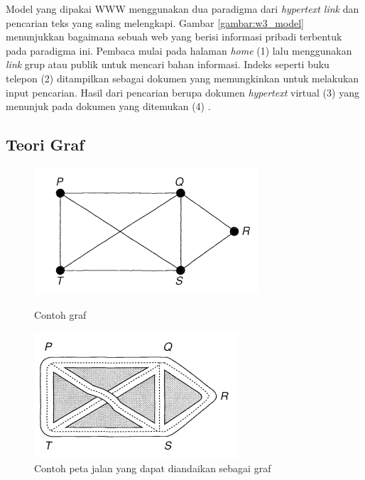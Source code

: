\documentclass[
	a4paper, %
	12pt, %
	unnumberedsections, %
	twoside, %
]{LTJournalArticle}
\begin{document}
Model yang dipakai WWW menggunakan dua paradigma dari \textit{hypertext link} dan pencarian teks yang saling melengkapi. Gambar \ref{gambar:w3_model} menunjukkan bagaimana sebuah web yang berisi informasi pribadi terbentuk pada paradigma ini. Pembaca mulai pada halaman \textit{home} (1) lalu menggunakan \textit{link} grup atau publik untuk mencari bahan informasi. Indeks seperti buku telepon (2) ditampilkan sebagai dokumen yang memungkinkan untuk melakukan input pencarian. Hasil dari pencarian berupa dokumen \textit{hypertext} virtual (3) yang menunjuk pada dokumen yang ditemukan (4) \citep{bernersLee1992}.

\subsection{Teori Graf}

\begin{figure}[!htb]
\begin{minipage}{0.48\linewidth}
	\centering
	\includegraphics[width=.7\linewidth]{gambar/graph_example}
	\caption{Contoh graf \citep{wilson1996}}
	\label{gambar:graph_example}
\end{minipage}\hfill
\begin{minipage}{0.48\linewidth}
	\centering
	\includegraphics[width=.7\linewidth]{gambar/graph_example_2}
	\caption{Contoh peta jalan yang dapat diandaikan sebagai graf \citep{wilson1996}}
	\label{gambar:graph_example_2}
\end{minipage}
\end{figure}
\end{document}
